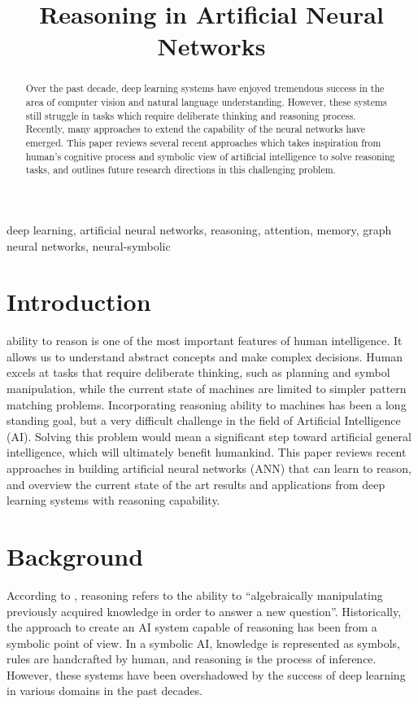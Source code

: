\documentclass[journal]{IEEEtran}
\begin{document}
\title{Reasoning in Artificial Neural Networks}

\author{%
}

\maketitle


\begin{abstract}
Over the past decade, deep learning systems have enjoyed tremendous success in the area of computer vision and natural language understanding.
However, these systems still struggle in tasks which require deliberate thinking and reasoning process. 
Recently, many approaches to extend the capability of the neural networks have emerged. 
This paper reviews several recent approaches which takes inspiration from human's cognitive process and symbolic view of artificial intelligence
to solve reasoning tasks, and outlines future research directions in this challenging problem.
\end{abstract}

\begin{IEEEkeywords}
deep learning, artificial neural networks, reasoning, attention, memory, graph neural networks, neural-symbolic
\end{IEEEkeywords}

\section{Introduction}

 ability to reason is one of the most important features of human intelligence. 
It allows us to understand abstract concepts and make complex decisions.
Human excels at tasks that require deliberate thinking, such as planning and symbol manipulation, 
while the current state of machines are limited to simpler pattern matching problems.
Incorporating reasoning ability to machines has been a long standing goal, but a very difficult challenge in the field of Artificial Intelligence (AI). 
Solving this problem would mean a significant step toward artificial general intelligence, which will ultimately benefit humankind. 
This paper reviews recent approaches in building artificial neural networks (ANN) that can learn to reason, 
and overview the current state of the art results and applications from deep learning systems with reasoning capability.

\section{Background}
According to \cite{bottou2014machine}, reasoning refers to the ability to ``algebraically manipulating previously acquired knowledge in order to answer a new question''.
Historically, the approach to create an AI system capable of reasoning has been from a symbolic point of view.
In a symbolic AI, knowledge is represented as symbols, rules are handcrafted by human, and reasoning is the process of inference.
However, these systems have been overshadowed by the success of deep learning in various domains in the past decades. 
\end{document}
